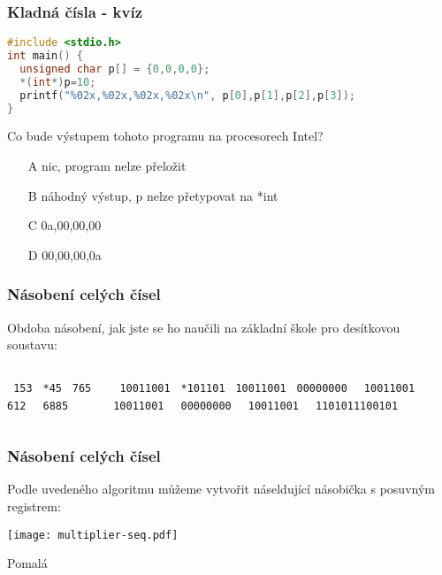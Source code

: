 \documentclass{beamer}
\begin{document}
\begin{frame}[fragile]
\frametitle{Kladná čísla - kvíz}
\begin{lstlisting}[language={C},columns=flexible]
#include <stdio.h>
int main() {
  unsigned char p[] = {0,0,0,0};
  *(int*)p=10;
  printf("%02x,%02x,%02x,%02x\n", p[0],p[1],p[2],p[3]);
}
\end{lstlisting}

Co bude výstupem tohoto programu na procesorech Intel?
\begin{itemize}
\item[A] nic, program nelze přeložit
\item[B] náhodný výstup, p  nelze přetypovat na *int
\item[C] 0a,00,00,00 
\item[D] 00,00,00,0a
\end{itemize}
\end{frame}



\begin{frame}
\frametitle{Násobení celých čísel}

Obdoba násobení, jak jste se ho naučili na základní škole pro desítkovou soustavu:
\begin{columns}
\begin{column}{0.4\textwidth}
\texttt{    153}
\texttt{    *45}
\blackrule[width=2.5cm, height=1pt, depth=0.5ex]
\texttt{    765}
\texttt{   612 }
\blackrule[width=2.5cm, height=1pt, depth=0.5ex]
\texttt{   6885}
\end{column}
\hfill
\begin{column}{0.4\textwidth}
\texttt{      10011001}
\texttt{       *101101}
\blackrule[width=2.5cm, height=1pt, depth=0.5ex]
\texttt{      10011001}
\texttt{     00000000 }
\texttt{    10011001  }
\texttt{   10011001   }
\texttt{  00000000    }
\texttt{ 10011001     }
\blackrule[width=2.5cm, height=1pt, depth=0.5ex]
\texttt{ 1101011100101}
\end{column}
\end{columns}

\end{frame}

\begin{frame}
\frametitle{Násobení celých čísel}

Podle uvedeného algoritmu můžeme vytvořit náseldující násobička s posuvným registrem:

\texttt{[image: multiplier-seq.pdf]}

Pomalá
\end{frame}
\end{document}
